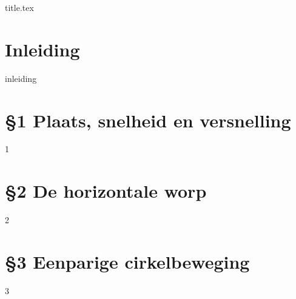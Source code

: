 

\usepackage{import}
\usepackage{./config/preambule}









{title.tex}

\section{Inleiding}
{inleiding}

\section[Outline]{}
\frame{\tableofcontents}

\section{\S1 Plaats, snelheid en versnelling}
{1}

\section{\S2 De horizontale worp}
{2}

\section{\S3 Eenparige cirkelbeweging}
{3}








